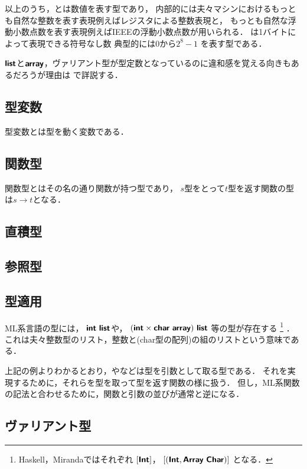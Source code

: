 \documentclass[a4paper,titlepage,report]{jsbook}
\begin{document}
以上のうち，とは数値を表す型であり，
内部的には夫々マシンにおけるもっとも自然な整数を表す表現\jpdash 例えばレジスタによる整数表現\jpdash と，
もっとも自然な浮動小数点数を表す表現\jpdash 例えばIEEEの浮動小数点数\jpdash が用いられる．
は1バイトによって表現できる符号なし数
\jpdash 典型的には$0$から$2^8-1$\jpdash 
を表す型である．

$\text{\sffamily\bfseries list}$と$\text{\sffamily\bfseries array}$，ヴァリアント型が型定数となっているのに違和感を覚える向きもあるだろうが理由は
で詳説する．

\subsection{型変数}\label{ssc:type-variable}
型変数とは型を動く変数である．

\subsection{関数型}\label{ssc:type-function}
関数型とはその名の通り関数が持つ型であり，
$s$型をとって$t$型を返す関数の型は$s\rightarrow t$となる．

\subsection{直積型}\label{ssc:type-tuple}
\subsection{参照型}\label{ssc:type-reference}

\subsection{型適用}\label{ssc:type-apply}
ML系言語の型には，
$\typename{int}\ \typename{list}$や，
$(\typename{int}\times\typename{char}\ \typename{array})\ \typename{list}$
等の型が存在する
\footnote{
    Haskell，Mirandaではそれぞれ
    $[\text{\sffamily\bfseries Int}]$，
    $[(\typename{Int}, \typename{Array}\ \typename{Char})]$
    となる．
    }
．
これは夫々整数型のリスト，整数と(char型の配列)の組のリストという意味である．

上記の例よりわかるとおり，やなどは型を引数として取る型である．
それを実現するために，それらを型を取って型を返す関数の様に扱う．
但し，ML系関数の記法と合わせるために，関数と引数の並びが通常と逆になる．

\subsection{ヴァリアント型}\label{ssc:type-variant}
\end{document}
